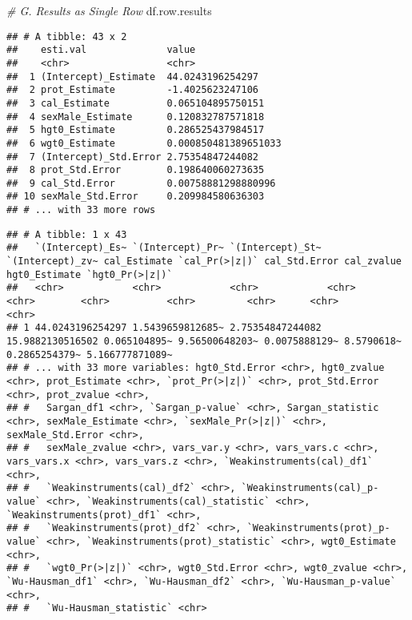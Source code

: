 \documentclass[
]{book}
\newenvironment{Shaded}{\begin{snugshade}}{\end{snugshade}}
\newcommand{\CommentTok}[1]{\textcolor[rgb]{0.56,0.35,0.01}{\textit{#1}}}
\newcommand{\KeywordTok}[1]{\textcolor[rgb]{0.13,0.29,0.53}{\textbf{#1}}}
\newcommand{\NormalTok}[1]{#1}
\newcommand{\OperatorTok}[1]{\textcolor[rgb]{0.81,0.36,0.00}{\textbf{#1}}}
\newcommand{\StringTok}[1]{\textcolor[rgb]{0.31,0.60,0.02}{#1}}
\begin{document}
\begin{Shaded}
\begin{Highlighting}[]
\CommentTok{# G. Results as Single Row}
\NormalTok{df.row.results}
\end{Highlighting}
\end{Shaded}

\begin{verbatim}
## # A tibble: 43 x 2
##    esti.val              value               
##    <chr>                 <chr>               
##  1 (Intercept)_Estimate  44.0243196254297    
##  2 prot_Estimate         -1.4025623247106    
##  3 cal_Estimate          0.065104895750151   
##  4 sexMale_Estimate      0.120832787571818   
##  5 hgt0_Estimate         0.286525437984517   
##  6 wgt0_Estimate         0.000850481389651033
##  7 (Intercept)_Std.Error 2.75354847244082    
##  8 prot_Std.Error        0.198640060273635   
##  9 cal_Std.Error         0.00758881298880996 
## 10 sexMale_Std.Error     0.209984580636303   
## # ... with 33 more rows
\end{verbatim}

\begin{Shaded}
\end{Shaded}

\begin{verbatim}
## # A tibble: 1 x 43
##   `(Intercept)_Es~ `(Intercept)_Pr~ `(Intercept)_St~ `(Intercept)_zv~ cal_Estimate `cal_Pr(>|z|)` cal_Std.Error cal_zvalue hgt0_Estimate `hgt0_Pr(>|z|)`
##   <chr>            <chr>            <chr>            <chr>            <chr>        <chr>          <chr>         <chr>      <chr>         <chr>          
## 1 44.0243196254297 1.5439659812685~ 2.75354847244082 15.9882130516502 0.065104895~ 9.56500648203~ 0.0075888129~ 8.5790618~ 0.2865254379~ 5.166777871089~
## # ... with 33 more variables: hgt0_Std.Error <chr>, hgt0_zvalue <chr>, prot_Estimate <chr>, `prot_Pr(>|z|)` <chr>, prot_Std.Error <chr>, prot_zvalue <chr>,
## #   Sargan_df1 <chr>, `Sargan_p-value` <chr>, Sargan_statistic <chr>, sexMale_Estimate <chr>, `sexMale_Pr(>|z|)` <chr>, sexMale_Std.Error <chr>,
## #   sexMale_zvalue <chr>, vars_var.y <chr>, vars_vars.c <chr>, vars_vars.x <chr>, vars_vars.z <chr>, `Weakinstruments(cal)_df1` <chr>,
## #   `Weakinstruments(cal)_df2` <chr>, `Weakinstruments(cal)_p-value` <chr>, `Weakinstruments(cal)_statistic` <chr>, `Weakinstruments(prot)_df1` <chr>,
## #   `Weakinstruments(prot)_df2` <chr>, `Weakinstruments(prot)_p-value` <chr>, `Weakinstruments(prot)_statistic` <chr>, wgt0_Estimate <chr>,
## #   `wgt0_Pr(>|z|)` <chr>, wgt0_Std.Error <chr>, wgt0_zvalue <chr>, `Wu-Hausman_df1` <chr>, `Wu-Hausman_df2` <chr>, `Wu-Hausman_p-value` <chr>,
## #   `Wu-Hausman_statistic` <chr>
\end{verbatim}
\end{document}
